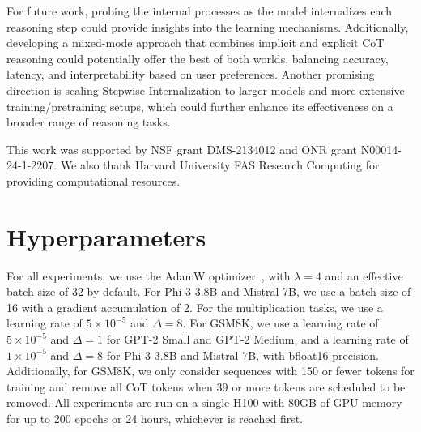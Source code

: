 \documentclass{article}
\begin{document}
For future work, probing the internal processes as the model internalizes each reasoning step could provide insights into the learning mechanisms. Additionally, developing a mixed-mode approach that combines implicit and explicit CoT reasoning could potentially offer the best of both worlds, balancing accuracy, latency, and interpretability based on user preferences. Another promising direction is scaling Stepwise Internalization to larger models and more extensive training/pretraining setups, which could further enhance its effectiveness on a broader range of reasoning tasks.

\begin{ack}
This work was supported by NSF grant DMS-2134012 and ONR grant N00014-24-1-2207. We also thank Harvard University FAS Research Computing for providing computational resources.
\end{ack}






\newpage
\appendix

\section{\label{sec:hyperparameters}Hyperparameters}
For all experiments, we use the AdamW optimizer~\citep{loshchilov2018decoupled}, with $\lambda=4$ and an effective batch size of 32 by default. For Phi-3 3.8B and Mistral 7B, we use a batch size of 16 with a gradient accumulation of 2. For the multiplication tasks, we use a learning rate of $5 \times 10^{-5}$ and $\Delta=8$. For GSM8K, we use a learning rate of $5 \times 10^{-5}$ and $\Delta=1$ for GPT-2 Small and GPT-2 Medium, and a learning rate of $1 \times 10^{-5}$ and $\Delta=8$ for Phi-3 3.8B and Mistral 7B, with bfloat16 precision. Additionally, for GSM8K, we only consider sequences with 150 or fewer tokens for training and remove all CoT tokens when 39 or more tokens are scheduled to be removed. All experiments are run on a single H100 with 80GB of GPU memory for up to 200 epochs or 24 hours, whichever is reached first.
\end{document}
